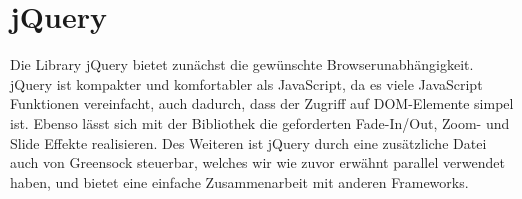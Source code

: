 \section{jQuery}
Die Library jQuery bietet zunächst die gewünschte Browserunabhängigkeit. jQuery ist kompakter und komfortabler als JavaScript, da es viele JavaScript Funktionen vereinfacht, auch dadurch, dass der Zugriff auf DOM-Elemente simpel ist. Ebenso lässt sich mit der Bibliothek die geforderten Fade-In/Out, Zoom- und Slide Effekte realisieren. Des Weiteren ist jQuery durch eine zusätzliche Datei auch von Greensock steuerbar, welches wir wie zuvor erwähnt parallel verwendet haben, und bietet eine einfache Zusammenarbeit mit anderen Frameworks.